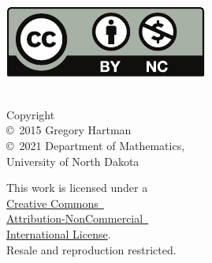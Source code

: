 \noindent\hspace{-1in}
\begin{minipage}[t]{.4\linewidth}\mbox{}\\
\href{http://creativecommons.org/licenses/by-nc/4.0/}{\includegraphics{figures/raw/by-nc}}
\end{minipage}\quad
\begin{minipage}[t]{.5\linewidth}\raggedright\mbox{}\\
\noindent Copyright\\
\copyright~2015 Gregory Hartman\\
\copyright~2021 Department of Mathematics,\\
University of North Dakota\medskip

\noindent
This work is licensed under a\iflatexml\ \else\\\fi \href{http://creativecommons.org/licenses/by-nc/4.0/}{Creative Commons\iflatexml\ \else\\\fi
Attribution-NonCommercial\iflatexml\ \else\\ International License}.\\
Resale and reproduction restricted.
\end{minipage}

